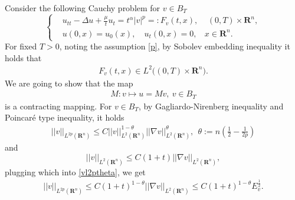 \documentclass[review]{elsarticle}
\newcommand{\R}{\mathbf{R}}
\begin{document}
Consider the following Cauchy problem for $v\in B_{T}$
\begin{equation}
\label{repdfv}
\left\{
\begin{aligned}
& u_{tt}-\Delta u+\frac{\mu}{t}u_t=t^\alpha|v|^p=:F_v(t, x), ~~~~~(0, T)\times\R^n,\\
& u(0, x)=u_0(x), \quad u_t(0, x)=0,~~~~x\in \R^n.
\end{aligned}
\right.
\end{equation}
For fixed $T>0$, noting the assumption \eqref{p}, by Sobolev embedding inequality it holds that
\begin{equation}
\begin{aligned}
F_v(t, x)\in L^2\big((0, T)\times\R^n\big).
\end{aligned}
\end{equation}
We are going to show that the map
\begin{equation}\label{mv}
\begin{aligned}
M:v\mapsto u=Mv,~v\in B_{T}
\end{aligned}
\end{equation}
is a contracting mapping. For $v\in B_{T}$, by Gagliardo-Nirenberg inequality and Poincar\'{e} type inequality, it holds
\begin{equation}\label{vl2ptheta}
\begin{aligned}
||v||_{L^{2p}(\R^n)}\leq C||v||_{L^2{(\R^n)}}^{1-\theta}||\nabla v||_{L^2{(\R^n)}}^{\theta},~~\theta:=n\left(\frac{1}{2}-\frac{1}{2p}\right)
\end{aligned}
\end{equation}
and
\[
||v||_{L^{2}(\R^n)}\leq C(1+t)||\nabla v||_{L^2{(\R^n)}},
\]
plugging which into \eqref{vl2ptheta}, we get
\begin{equation}\label{vl2p}
\begin{aligned}
||v||_{L^{2p}(\R^n)}\leq C(1+t)^{1-\theta}||\nabla v||_{L^2{(\R^n)}}\leq C(1+t)^{1-\theta}E_v^{\frac{1}{2}}.
\end{aligned}
\end{equation}
\end{document}

